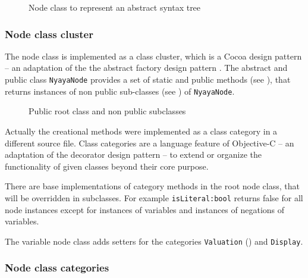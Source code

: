 \begin{figure}[htbp]
\begin{center}
\caption{Node class to represent an abstract syntax tree}
\label{fig:NyayaNode}
\end{center}
\end{figure}

\subsubsection{Node class cluster}

The node class is implemented as a class cluster, 
which is a Cocoa design pattern \cite[p.282ff]{Buck:2009:CDP:1803585}
– an adaptation of the the abstract factory design pattern \cite[p.87ff]{GAMMAETAL}.
The abstract and public class \verb+NyayaNode+ 
provides a set of static and public methods (see ),
that returns instances of non public sub-classes (see )
of \verb+NyayaNode+.

\begin{figure}[htbp]
\begin{center}
\caption{Public root class and non public subclasses}
\label{fig:NyayaNodeCluster}
\end{center}
\end{figure}

Actually the creational methods were implemented as a class category in a different source file. 
Class categories are a language feature of Objective-C \cite[p.225ff]{Kochan:2009:PO:1538451}
– an adaptation of the decorator design pattern \cite[p.175ff]{GAMMAETAL} – 
to extend or organize the functionality of given classes beyond their core purpose. 

There are base implementations of category methods in the root node class,
that will be overridden in subclasses.
For example \verb+isLiteral:bool+ returns false for all node instances
except for instances of variables
and instances of negations of variables.

The variable node class adds setters for the categories \verb+Valuation+  ()
and \verb+Display+.

\subsubsection{Node class categories}

